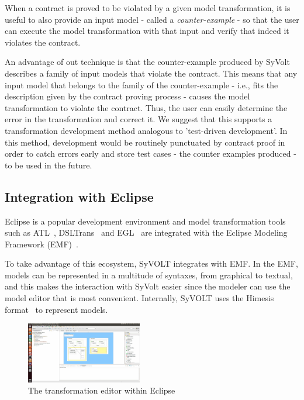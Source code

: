 When a contract is proved to be violated by a given model transformation, it is
useful to also provide an input model - called a \emph{counter-example} - so
that the user can execute the model transformation with that input and verify
that indeed it violates the contract.

An advantage of out technique is that the counter-example produced by SyVolt
describes a family of input models that violate the contract. This means that
any input model that belongs to the family of the counter-example - i.e., fits
the description given by the contract proving process - causes the model
transformation to violate the contract.  Thus, the user can easily determine the error in the
transformation and correct it. We suggest that this supports a transformation
development method analogous to 'test-driven development'. In this method,
development would be routinely punctuated by contract proof in order to catch
errors early and store test cases - the counter examples produced - to be used
in the future.


\subsection{Integration with Eclipse}

Eclipse is a popular development environment and model transformation
tools such as ATL~\cite{atlTool}, DSLTrans~\cite{Barroca2011} and
EGL~\cite{eglTool} are integrated with the Eclipse Modeling Framework
(EMF)~\cite{emfTool}.

To take advantage of this ecosystem, SyVOLT integrates with EMF.
In the EMF, models can be represented in a multitude of syntaxes, from graphical
to textual, and this makes the interaction with SyVolt easier since the modeler
can use the model editor that is most convenient. Internally, SyVOLT uses 
the Himesis format~\cite{Provost2006} to represent models.



\begin{figure}
\centering
\includegraphics[width=0.45\textwidth]{figures/eclipse_frontend}
\caption{The transformation editor within Eclipse}
\label{fig:eclipse_frontend}
\end{figure}




 